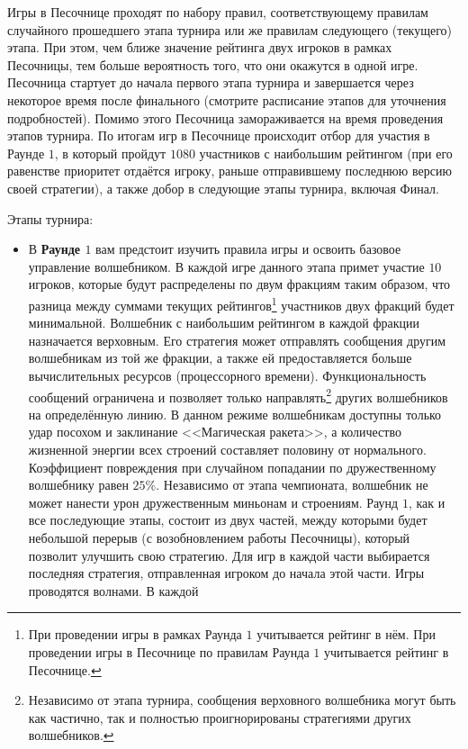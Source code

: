 Игры в Песочнице проходят по набору правил, соответствующему правилам случайного прошедшего этапа турнира или же правилам следующего
(текущего) этапа. При этом, чем ближе значение рейтинга двух игроков в рамках Песочницы, тем больше вероятность того, что они окажутся в
одной игре. Песочница стартует до начала первого этапа турнира и завершается через некоторое время после финального (смотрите расписание
этапов для уточнения подробностей). Помимо этого Песочница замораживается на время проведения этапов турнира. По итогам игр в Песочнице
происходит отбор для участия в Раунде $1$, в который пройдут $1080$ участников с наибольшим рейтингом (при его равенстве приоритет отдаётся
игроку, раньше отправившему последнюю версию своей стратегии), а также добор в следующие этапы турнира, включая Финал.

Этапы турнира:
\begin{itemize}
  \item В \textbf{Раунде $1$} вам предстоит изучить правила игры и освоить базовое управление волшебником. В каждой игре данного этапа
        примет участие $10$ игроков, которые будут распределены по двум фракциям таким образом, что разница между суммами текущих
        рейтингов\footnote[1]{При проведении игры в рамках Раунда $1$ учитывается рейтинг в нём. При проведении игры в Песочнице по правилам
        Раунда $1$ учитывается рейтинг в Песочнице.} участников двух фракций будет минимальной. Волшебник с наибольшим рейтингом в каждой
        фракции назначается верховным. Его стратегия может отправлять сообщения другим волшебникам из той же фракции, а также ей
        предоставляется больше вычислительных ресурсов (процессорного времени). Функциональность сообщений ограничена и позволяет только
        направлять\footnote[2]{Независимо от этапа турнира, сообщения верховного волшебника могут быть как частично, так и полностью
        проигнорированы стратегиями других волшебников.} других волшебников на определённую линию. В данном режиме волшебникам доступны
        только удар посохом и заклинание <<Магическая ракета>>, а количество жизненной энергии всех строений составляет половину от
        нормального. Коэффициент повреждения при случайном попадании по дружественному волшебнику равен $25\%$. Независимо от этапа
        чемпионата, волшебник не может нанести урон дружественным миньонам и строениям. Раунд $1$, как и все последующие этапы, состоит из
        двух частей, между которыми будет небольшой перерыв (с возобновлением работы Песочницы), который позволит улучшить свою стратегию.
        Для игр в каждой части выбирается последняя стратегия, отправленная игроком до начала этой части. Игры проводятся волнами. В каждой

\end{itemize}
